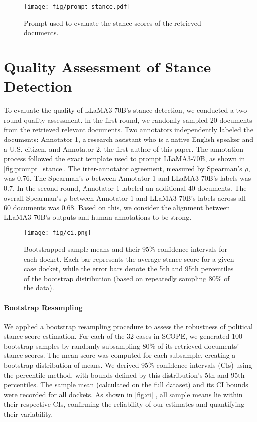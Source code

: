 \begin{figure*}[]
\centering
\texttt{[image: fig/prompt\_stance.pdf]}
\caption{Prompt used to evaluate the stance scores of the retrieved documents.}
\label{fig:prompt_stance}
\end{figure*}

\section{Quality Assessment of Stance Detection}
\label{app:stance_quality}
To evaluate the quality of LLaMA3-70B’s stance detection, we conducted a two-round quality assessment.
In the first round, we randomly sampled 20 documents from the retrieved relevant documents. Two annotators independently labeled the documents: Annotator 1, a research assistant who is a native English speaker and a U.S. citizen, and Annotator 2, the first author of this paper. The annotation process followed the exact template used to prompt LLaMA3-70B, as shown in \autoref{fig:prompt_stance}. The inter-annotator agreement, measured by Spearman’s $\rho$, was 0.76. The Spearman’s $\rho$ between Annotator 1 and LLaMA3-70B’s labels was 0.7.
In the second round, Annotator 1 labeled an additional 40 documents. The overall Spearman’s $\rho$ between Annotator 1 and LLaMA3-70B’s labels across all 60 documents was 0.68. Based on this, we consider the alignment between LLaMA3-70B’s outputs and human annotations to be strong.

\begin{figure*}[]
\centering
\texttt{[image: fig/ci.png]}
\caption{Bootstrapped sample means and their 95\% confidence intervals for each docket. Each bar represents the average stance score for a given case docket, while the error bars denote the 5th and 95th percentiles of the bootstrap distribution (based on repeatedly sampling 80\% of the data).
}
\label{fig:ci}
\end{figure*}


\paragraph{Bootstrap Resampling} 
We applied a bootstrap resampling procedure to assess the robustness of political stance score estimation. For each of the 32 cases in SCOPE, we generated 100 bootstrap samples by randomly subsampling 80\% of its retrieved documents' stance scores. The mean score was computed for each subsample, creating a bootstrap distribution of means. We derived 95\% confidence intervals (CIs) using the percentile method, with bounds defined by this distribution's 5th and 95th percentiles. The sample mean (calculated on the full dataset) and its CI bounds were recorded for all dockets. As shown in \autoref{fig:ci} , all sample means lie within their respective CIs, confirming the reliability of our estimates and quantifying their variability.

